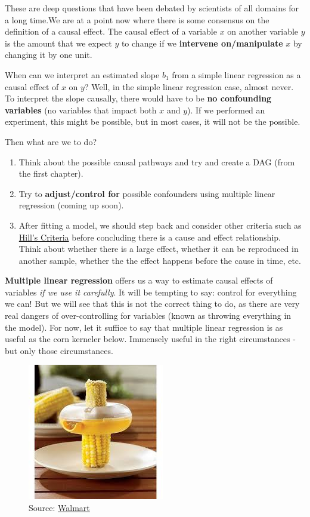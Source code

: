 \documentclass[]{book}
\providecommand{\tightlist}{%
  \setlength{\itemsep}{0pt}\setlength{\parskip}{0pt}}
\begin{document}
These are deep questions that have been debated by scientists of all domains for a long time.We are at a point now where there is some consensus on the definition of a causal effect. The causal effect of a variable \(x\) on another variable \(y\) is the amount that we expect \(y\) to change if we \textbf{intervene on/manipulate} \(x\) by changing it by one unit.

When can we interpret an estimated slope \(b_1\) from a simple linear regression as a causal effect of \(x\) on \(y\)? Well, in the simple linear regression case, almost never. To interpret the slope causally, there would have to be \textbf{no confounding variables} (no variables that impact both \(x\) and \(y\)). If we performed an experiment, this might be possible, but in most cases, it will not be the possible.

Then what are we to do?

\begin{enumerate}
\def\labelenumi{\arabic{enumi}.}
\tightlist
\item
  Think about the possible causal pathways and try and create a DAG (from the first chapter).
\item
  Try to \textbf{adjust/control for} possible confounders using multiple linear regression (coming up soon).
\item
  After fitting a model, we should step back and consider other criteria such as \href{https://en.wikipedia.org/wiki/Bradford_Hill_criteria}{Hill's Criteria} before concluding there is a cause and effect relationship. Think about whether there is a large effect, whether it can be reproduced in another sample, whether the the effect happens before the cause in time, etc.
\end{enumerate}

\textbf{Multiple linear regression} offers us a way to estimate causal effects of variables \emph{if we use it carefully}. It will be tempting to say: control for everything we can! But we will see that this is not the correct thing to do, as there are very real dangers of over-controlling for variables (known as throwing everything in the model). For now, let it suffice to say that multiple linear regression is as useful as the corn kerneler below. Immensely useful in the right circumstances - but only those circumstances.

\begin{figure}
\centering
\includegraphics{Photos/corn.jpeg}
\caption{Source: \href{https://www.walmart.com/ip/Corn-Kerneler-w-Stainless-Steel-Blades/139735616}{Walmart}}
\end{figure}
\end{document}
